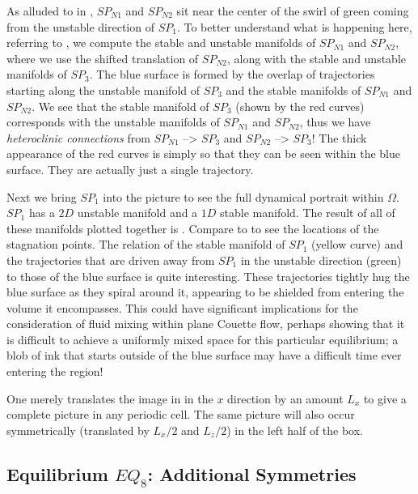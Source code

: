 \documentclass[letter,12pt,openany]{article}
\begin{document}
 As alluded to in , $SP_{N1}$ and $SP_{N2}$ sit near the center of the swirl of green coming from the unstable direction of $SP_1$. To better understand what is happening here, referring to , we compute the  stable and unstable manifolds of $SP_{N1}$ and $SP_{N2}$, where we use the shifted translation of $SP_{N2}$, along with the stable and unstable manifolds of $SP_3$. The blue surface is formed by the overlap of trajectories starting along the unstable manifold of $SP_3$ and the stable manifolds of $SP_{N1}$ and $SP_{N2}$.  We see that the stable manifold of $SP_3$ (shown by the red curves) corresponds with the unstable manifolds of $SP_{N1}$ and $SP_{N2}$, thus we have \textit{heteroclinic connections} from $SP_{N1}$ --> $SP_3$ and $SP_{N2}$ --> $SP_3$!
 The thick appearance of the red curves
 is simply so that they can be seen within the blue surface. They are actually just a single trajectory.
 
 Next we bring $SP_1$ into the picture to see the full dynamical portrait within $\Omega$. $SP_1$ has a $2D$ unstable manifold
 and a $1D$ stable manifold. The result of all of these manifolds
 plotted together is . Compare to  to see the locations of the stagnation points. The relation of the
 stable manifold of $SP_1$ (yellow curve) and the trajectories that are driven away from $SP_1$ in the unstable direction (green)
 to those of the blue surface is quite interesting. These trajectories
 tightly hug the blue surface as they spiral around it, appearing to be shielded from entering the volume it encompasses. This could have significant implications for the consideration of fluid mixing within plane Couette flow, perhaps showing that it is difficult to achieve a uniformly mixed space for this particular equilibrium; a blob of ink that starts outside of the blue surface may have a difficult time ever entering the region!
 
 One merely translates the image in  in the
 $x$ direction by an amount $L_{x}$ to give a complete picture in
 any periodic cell. The same picture will also occur symmetrically
 (translated by $L_{x}/2$ and $L_{z}/2$) in the left half of the
 box.
  
 





   \subsection{Equilibrium $EQ_8$: Additional Symmetries}
   \label{sect:EQ8}
\end{document}
